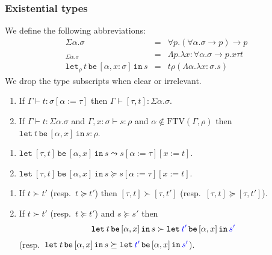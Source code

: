 \documentclass[runningheads,a4paper]{llncs}
\newcommand{\arrtype}{\rightarrow}
\newcommand{\abs}[2]{\lambda #1.#2}
\newcommand{\tabs}[2]{\Lambda #1.#2}
\newcommand{\expair}[2]{[#1,#2]}
\newcommand{\subst}[2]{#1:=#2}
\newcommand{\FTV}{\mathrm{FTV}}
\newcommand{\flatten}{\mathtt{flatten}}
\newcommand{\lift}{\mathtt{lift}}
\newcommand{\proves}{\vdash}
\newcommand{\xlet}[4]{\mathtt{let}_{#1}\,#2\,\mathtt{be}\,[#3]\,\mathtt{in}\,#4}
\newcommand{\CKchange}[1]{\textcolor{blue}{#1}}
\begin{document}
\subsubsection{Existential types}

\begin{definition}\normalfont
  We define the following abbreviations:
  \[
  \begin{array}{rcl}
    \Sigma \alpha . \sigma &=& \forall p . (\forall \alpha . \sigma \arrtype p) \arrtype p \\
    \expair{\tau}{t}_{\Sigma\alpha.\sigma} &=& \tabs{p}{\abs{x:\forall\alpha.\sigma\arrtype p}{x \tau t %
    }} \\
    \xlet{\rho}{t}{\alpha,x:\sigma}{s} &=& t \rho (\tabs{\alpha}{\abs{x:\sigma}{s}})
  \end{array}
  \]
  We drop the type subscripts when clear or irrelevant.
\end{definition}

\begin{lemma}
  \begin{enumerate}
  \item If $\Gamma \proves t : \sigma[\subst{\alpha}{\tau}]$ then
    $\Gamma \proves \expair{\tau}{t} : \Sigma \alpha . \sigma$.
  \item If $\Gamma \proves t : \Sigma \alpha . \sigma$ and
    $\Gamma,x:\sigma \proves s : \rho$ and $\alpha \notin
    \FTV(\Gamma,\rho)$ then $\xlet{}{t}{\alpha,x}{s} : \rho$.
  \end{enumerate}
\end{lemma}

\begin{lemma}
  \begin{enumerate}
  \item $\xlet{}{\expair{\tau}{t}}{\alpha,x}{s} \leadsto
    s[\subst{\alpha}{\tau}][\subst{x}{t}] %
    $.
  \item $\xlet{}{\expair{\tau}{t}}{\alpha,x}{s} \succeq
    s[\subst{\alpha}{\tau}][\subst{x}{t}]$.
  \end{enumerate}
\end{lemma}

\begin{lemma}
  \begin{enumerate}
  \item If $t \succ t'$ (resp.~$t \succeq t'$) then $\expair{\tau}{t}
    \succ \expair{\tau}{t'}$ (resp.~$\expair{\tau}{t} \succeq
    \expair{\tau}{t'}$).
  \item If $t \succ t'$ (resp.~$t \succeq t'$) and $s \succeq s'$ then
    \[
    \xlet{}{t}{\alpha,x}{s} \succ \xlet{}{\CKchange{t'}}{\alpha,x}{\CKchange{s'}}
    \]
    (resp.~$\xlet{}{t}{\alpha,x}{s} \succeq \xlet{}{\CKchange{t'}}{\alpha,x}{\CKchange{s'}}$).
  \end{enumerate}
\end{lemma}
\end{document}
